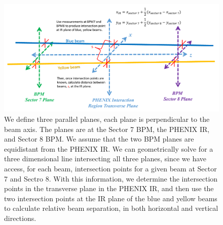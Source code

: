 \begin{figure}
\begin{center}
\includegraphics[width=1.0\linewidth]{../DataStreams/figs/bpm_ir_beam_separation}
\caption{We define three parallel planes, each plane is perpendicular to the beam axis.
The planes are at the Sector 7 BPM, the PHENIX IR, and Sector 8 BPM. We assume that the
two BPM planes are equidistant from the PHENIX IR. We can geometrically solve for a three
dimensional line intersecting all three planes, since we have access, for each beam,
intersection points for a given beam at Sector 7 and Sectro 8. With this information, we
determine the intersection points in the transverse plane in the PHENIX IR, and then use
the two intersection points at the IR plane of the blue and yellow beams to calculate
relative beam separation, in both horizontal and vertical directions.}
\label{fig:bpm_ir_xing_cartoon}
\end{center}
\end{figure}

